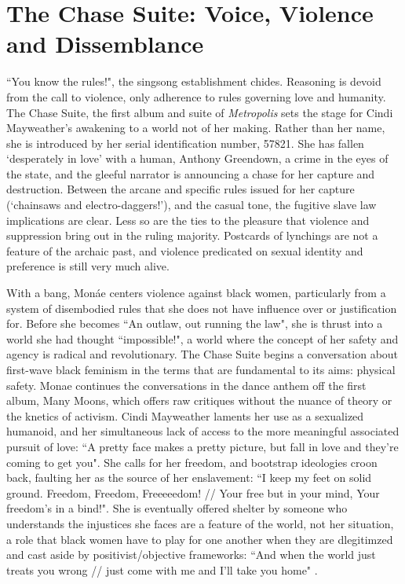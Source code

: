 \documentclass[a4paper, 11pt]{article} %
\begin{document}

\section*{The Chase Suite: Voice, Violence and Dissemblance}

``You know the rules!"\cite{wolfmasters}, the singsong establishment chides.
Reasoning is devoid from the call to violence, only adherence to rules governing love and humanity.
The Chase Suite, the first album and suite of \emph{Metropolis} sets the stage for Cindi Mayweather's awakening to a world not of her making.
Rather than her name, she is introduced by her serial identification number, 57821.
She has fallen `desperately in love' with a human, Anthony Greendown, a crime in the eyes of the state, and the gleeful narrator is announcing a chase for her capture and destruction.
Between the arcane and specific rules issued for her capture (`chainsaws and electro-daggers!'\cite{wolfmasters}), and the casual tone, the fugitive slave law implications are clear.
Less so are the ties to the pleasure that violence and suppression bring out in the ruling majority.
Postcards of lynchings are not a feature of the archaic past, and violence predicated on sexual identity and preference is still very much alive.

With a bang, Mon\'ae centers violence against black women, particularly from a system of disembodied rules that she does not have influence over or justification for.
Before she becomes ``An outlaw, out running the law"\cite{neonvalleystreet}, she is thrust into a world she had thought ``impossible!"\cite{happyhunting}, a world where the concept of her safety and agency is radical and revolutionary.
The Chase Suite begins a conversation about first-wave black feminism in the terms that are fundamental to its aims: physical safety.
Monae continues the conversations in the dance anthem off the first album, Many Moons, which offers raw critiques without the nuance of theory or the knetics of activism.
Cindi Mayweather laments her use as a sexualized humanoid, and her simultaneous lack of access to the more meaningful associated pursuit of love: ``A pretty face makes a pretty picture, but fall in love and they're coming to get you"\cite{happyhunting}.
She calls for her freedom, and bootstrap ideologies croon back, faulting her as the source of her enslavement: ``I keep my feet on solid ground. Freedom, Freedom, Freeeeedom! // Your free but in your mind, Your freedom's in a bind!"\cite{manymoons}.
She is eventually offered shelter by someone who understands the injustices she faces are a feature of the world, not her situation, a role that black women have to play for one another when they are dlegitimzed and cast aside by positivist/objective frameworks:
``And when the world just treats you wrong // just come with me and I'll take you home" \cite{manymoons}.
\end{document}
